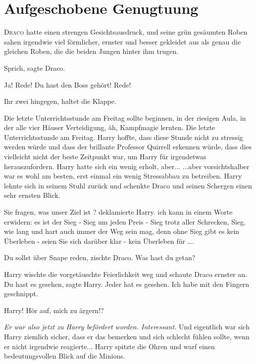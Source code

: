 \chapter{Aufgeschobene Genugtuung}

\lettrine{D}{raco} hatte einen strengen Gesichtsausdruck, und seine grün
gesäumten Roben sahen irgendwie viel förmlicher, ernster und besser gekleidet
aus als genau die gleichen Roben, die die beiden Jungen hinter ihm trugen.

\glqq{}Sprich\grqq{}, sagte Draco.

\glqq{}Ja! Rede!\grqq{} \glqq{}Du hast den Boss gehört! Rede!\grqq{}

\glqq{}Ihr zwei hingegen, haltet die Klappe.\grqq{}

Die letzte Unterrichtsstunde am Freitag sollte beginnen, in der riesigen Aula,
in der alle vier Häuser Verteidigung, äh, Kampfmagie lernten. Die letzte
Unterrichtsstunde am Freitag. Harry hoffte, dass diese Stunde nicht zu stressig
werden würde und dass der brillante Professor Quirrell erkennen würde, dass dies
vielleicht nicht der beste Zeitpunkt war, um Harry für irgendetwas
herauszufordern. Harry hatte sich ein wenig erholt, aber... ...aber
vorsichtshalber war es wohl am besten, erst einmal ein wenig Stressabbau zu
betreiben. Harry lehnte sich in seinem Stuhl zurück und schenkte Draco und
seinen Schergen einen sehr ernsten Blick.

\glqq{}Sie fragen, was unser Ziel ist ?\grqq{} deklamierte Harry. \glqq{}ich kann
in einem Worte erwidern: es ist der Sieg - Sieg um jeden Preis - Sieg trotz
aller Schrecken, Sieg, wie lang und hart auch immer der Weg sein mag, denn ohne
Sieg gibt es kein Überleben - seien Sie sich darüber klar - kein Überleben für
….\grqq{}

\glqq{}Du sollst über Snape reden\grqq{}, zischte Draco. \glqq{}Was hast du
getan?\grqq{}

Harry wischte die vorgetäuschte Feierlichkeit weg und schaute Draco ernster an.
\glqq{}Du hast es gesehen\grqq{}, sagte Harry. \glqq{}Jeder hat es gesehen. Ich
habe mit den Fingern geschnippt.\grqq{}

\glqq{}Harry! Hör auf, mich zu ärgern!?\grqq{}

\emph{Er war also jetzt zu Harry befördert worden. Interessant.} Und eigentlich
war sich Harry ziemlich sicher, dass er das bemerken und sich schlecht fühlen
sollte, wenn er nicht irgendwie reagierte... Harry spitzte die Ohren und warf
einen bedeutungsvollen Blick auf die Minions.

